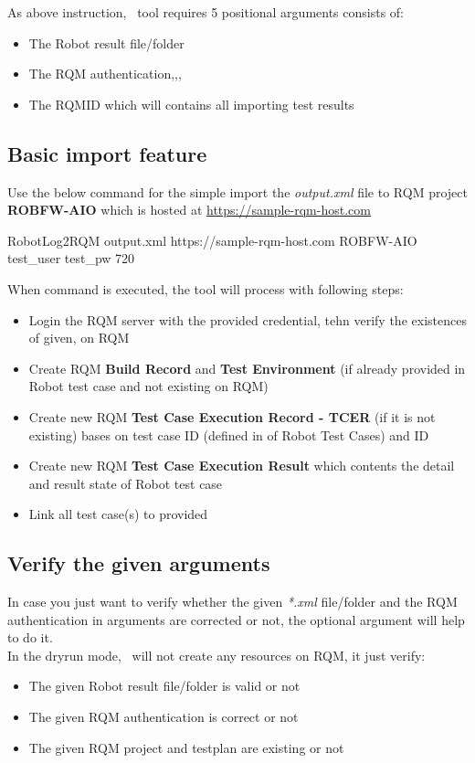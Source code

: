 As above instruction, \pkg\ tool requires 5 positional arguments consists of:
\begin{itemize}
  \item The Robot result file/folder
  \item The RQM authentication,,,
  \item The RQMID which will contains all importing test results
\end{itemize} 

\subsection{Basic import feature}
Use the below command for the simple import the \emph{output.xml} file to RQM 
project \textbf{ROBFW-AIO} which is hosted at 
\href{https://sample-rqm-host.com}{https://sample-rqm-host.com}
\begin{robotlog}
RobotLog2RQM output.xml https://sample-rqm-host.com ROBFW-AIO test_user test_pw 720
\end{robotlog}

When command is executed, the tool will process with following steps:
\begin{itemize}
\item Login the RQM server with the provided credential, tehn verify the 
      existences of given, on RQM
\item Create RQM \textbf{Build Record} and \textbf{Test Environment} (if already 
      provided in Robot test case and not existing on RQM)
\item Create new RQM \textbf{Test Case Execution Record - TCER} 
      (if it is not existing) bases on test case ID (defined  in
      \rcode{[Tags]} of Robot Test Cases) and  ID
\item Create new RQM \textbf{Test Case Execution Result} which contents 
      the detail and result state of Robot test case
\item Link all test case(s) to provided 
\end{itemize}

\subsection{Verify the given arguments}
In case you just want to verify whether the given \emph{*.xml} file/folder and 
the RQM authentication in arguments are corrected or not, the optional argument
 will help to do it.
\\
In the dryrun mode, \pkg\ will not create any resources on RQM, it 
just verify:
\begin{itemize}
  \item The given Robot result file/folder is valid or not
  \item The given RQM authentication is correct or not
  \item The given RQM project and testplan are existing or not
\end{itemize}

